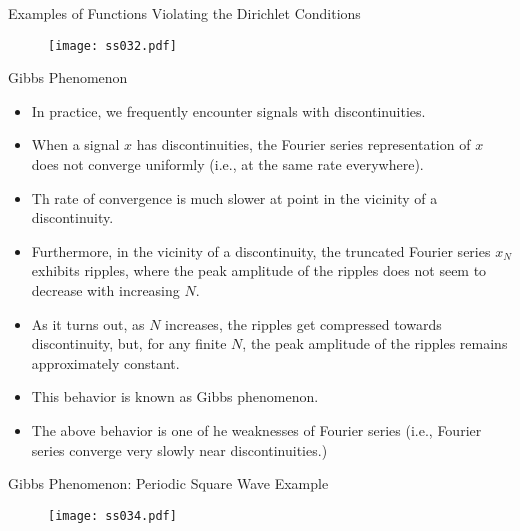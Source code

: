 
\begin{frame}{Examples of Functions Violating the Dirichlet Conditions}
\begin{figure}
\centering
\texttt{[image: ss032.pdf]}
\end{figure}
\end{frame}

\begin{frame}{Gibbs Phenomenon}
\begin{itemize}
\item In practice, we frequently encounter signals with discontinuities.
\item When a signal $x$ has discontinuities, the Fourier series representation of $x$ does not converge uniformly (i.e., at the same rate everywhere).
\item Th rate of convergence is much slower at point in the vicinity of a discontinuity.
\item Furthermore, in the vicinity of a discontinuity, the truncated Fourier series $x_N$ exhibits ripples, where the peak amplitude of the ripples does not seem to decrease with increasing $N$.
\item As it turns out, as $N$ increases, the ripples get compressed towards discontinuity, but, for any finite $N$, the peak amplitude of the ripples remains approximately constant.
\item This behavior is known as {\color{red}Gibbs phenomenon}.
\item The above behavior is one of he weaknesses of Fourier series (i.e., Fourier series converge very slowly near discontinuities.)
\end{itemize}
\end{frame}


\begin{frame}{Gibbs Phenomenon: Periodic Square Wave Example}
\begin{figure}
\centering
\texttt{[image: ss034.pdf]}
\end{figure}
\end{frame}


